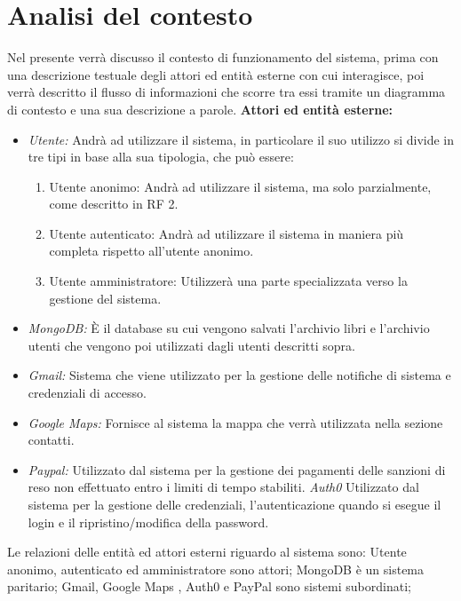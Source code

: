 \documentclass{article}
\begin{document}
\section{Analisi del contesto}
Nel presente verrà discusso il contesto di funzionamento del sistema, prima con una descrizione testuale degli attori ed entità esterne con cui interagisce, poi verrà descritto il flusso di informazioni che scorre tra essi tramite un diagramma di contesto e una sua descrizione a parole.
\textbf{Attori ed entità esterne:}
\begin{itemize}
    \item \textit{Utente:}
    Andrà ad utilizzare il sistema, in particolare  il suo utilizzo si divide in tre tipi in base alla sua tipologia, che può essere:
    \begin{enumerate}
        \item Utente anonimo:
        Andrà ad utilizzare il sistema, ma solo parzialmente, come descritto in RF 2.
        \item Utente autenticato:
        Andrà ad utilizzare il sistema in maniera più completa rispetto all’utente anonimo.
        \item Utente amministratore:
        Utilizzerà una parte specializzata verso la gestione del sistema.
        \end{enumerate}
    \item \textit{MongoDB:}
    È il database su cui vengono salvati l’archivio libri e l’archivio utenti che vengono poi utilizzati dagli utenti descritti sopra.
    \item \textit{Gmail:}
    Sistema che viene utilizzato per la gestione delle notifiche di sistema e credenziali di accesso.
    \item \textit{Google Maps:}
    Fornisce al sistema la mappa che verrà utilizzata nella sezione contatti.
    \item \textit{Paypal:}
    Utilizzato dal sistema per la gestione dei pagamenti delle sanzioni di reso non effettuato entro i limiti di tempo stabiliti.
    \iteml \textit{Auth0}
    Utilizzato dal sistema per la gestione delle credenziali, l'autenticazione quando si esegue il login e il ripristino/modifica della password.
\end{itemize}
Le relazioni delle entità ed attori esterni riguardo al sistema sono:
Utente anonimo, autenticato ed amministratore sono attori; MongoDB è un sistema paritario;
Gmail, Google Maps , Auth0 e PayPal sono sistemi subordinati;
\end{document}
